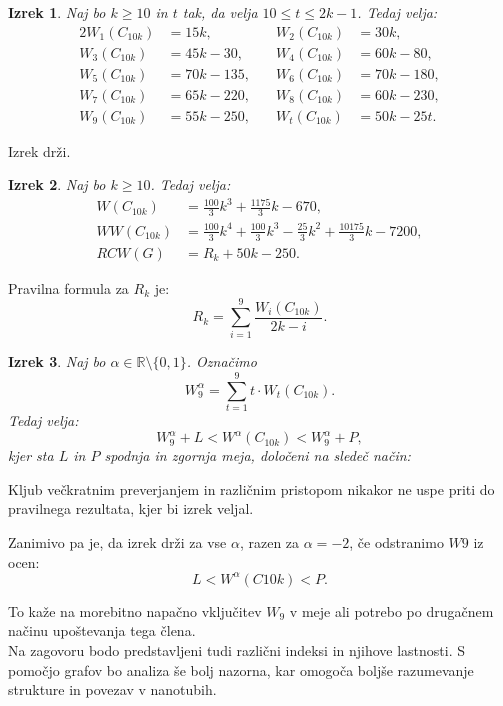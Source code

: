 \documentclass[a4paper, 12pt]{article}
\newtheorem{izrek}{Izrek}[section]
\begin{document}
\begin{izrek}
    Naj bo $k \geq 10$ in $t$ tak, da velja $10 \leq t \leq 2k - 1$. Tedaj velja:
    \begin{alignat*}{2}
        W_1(C_{10k}) &= 15k,  &\quad W_2(C_{10k}) &= 30k, \\
        W_3(C_{10k}) &= 45k - 30, &\quad W_4(C_{10k}) &= 60k - 80, \\
        W_5(C_{10k}) &= 70k - 135, &\quad W_6(C_{10k}) &= 70k - 180, \\
        W_7(C_{10k}) &= 65k - 220, &\quad W_8(C_{10k}) &= 60k - 230, \\
        W_9(C_{10k}) &= 55k - 250, &\quad W_t(C_{10k}) &= 50k - 25t.
    \end{alignat*}
\end{izrek}

Izrek drži.

\begin{izrek}
    Naj bo $k \geq 10$. Tedaj velja:
    \begin{align*}
        W(C_{10k}) &= \frac{100}{3} k^3 + \frac{1175}{3} k - 670, \\
        WW(C_{10k}) &= \frac{100}{3} k^4 + \frac{100}{3} k^3 - \frac{25}{3} k^2 + \frac{10175}{3} k - 7200, \\
        RCW(G) &= R_k + 50k - 250.
    \end{align*}
\end{izrek}

Pravilna formula za $R_k$ je:
\begin{equation*}
    R_k = \sum_{i=1}^{9} \frac{W_i(C_{10k})}{2k - i}.
\end{equation*}

\begin{izrek}
    Naj bo $\alpha \in \mathbb{R} \setminus \{0,1\}$. Označimo
    \begin{equation*}
        W_9^\alpha = \sum_{t=1}^{9} t \cdot W_t(C_{10k}).
    \end{equation*}
    Tedaj velja:
    \begin{equation*}
        W_9^\alpha + L < W^\alpha(C_{10k}) < W_9^\alpha + P,
    \end{equation*}
    kjer sta $L$ in $P$ spodnja in zgornja meja, določeni na sledeč način:
\end{izrek}

   Kljub večkratnim preverjanjem in različnim pristopom nikakor ne uspe priti do pravilnega rezultata, 
   kjer bi izrek veljal.
   
   Zanimivo pa je, da izrek drži za vse $\alpha$, razen za $\alpha = -2$, če odstranimo $W9$ iz ocen:
   \[
   L < W^\alpha(C{10k}) < P.
   \]
   
   To kaže na morebitno napačno vključitev $W_9$ v meje ali potrebo po drugačnem načinu upoštevanja tega člena. \\


Na zagovoru bodo predstavljeni tudi različni indeksi in njihove lastnosti.
S pomočjo grafov bo analiza še bolj nazorna, kar omogoča boljše razumevanje strukture in povezav v nanotubih.
\end{document}
